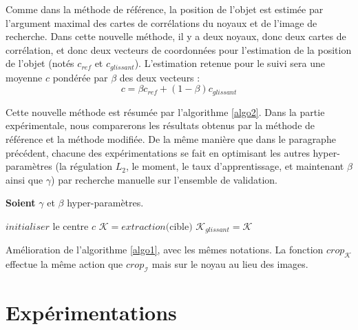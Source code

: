 \documentclass[10pt,twocolumn,letterpaper,french]{article}
\begin{document}
Comme dans la méthode de référence, la position de l'objet est estimée par l'argument maximal des cartes de corrélations du noyaux et de l'image de recherche. Dans cette nouvelle méthode, il y a deux noyaux, donc deux cartes de corrélation, et donc deux vecteurs de coordonnées pour l'estimation de la position de l'objet (notés $c_{ref}$ et $c_{glissant}$). L'estimation retenue pour le suivi sera une moyenne $c$ pondérée par $\beta$ des deux vecteurs :
$$c = \beta c_{ref} + (1-\beta) c_{glissant}$$

Cette nouvelle méthode est résumée par l'algorithme \ref{algo2}. Dans la partie expérimentale, nous comparerons les résultats obtenus par la méthode de référence et la méthode modifiée. De la même manière que dans le paragraphe précédent, chacune des expérimentations se fait en optimisant les autres hyper-paramètres (la régulation $L_2$, le moment, le taux d'apprentissage, et maintenant $\beta$ ainsi que $\gamma$) par recherche manuelle sur l'ensemble de validation.

\begin{algorithm}
\label{algo2}
\textbf{Soient} $\gamma$ et $\beta$ hyper-paramètres.

\SetAlgoLined
 $initialiser$ le centre $c$ \;
 $\mathcal{K} = extraction($cible$)$\;
 $\mathcal{K}_{glissant} = \mathcal{K}$\;
\caption{Amélioration de l'algorithme \ref{algo1}, avec les mêmes notations. La fonction $crop_{\mathcal{K}}$ effectue la même action que $crop_{\mathcal{I}}$ mais sur le noyau au lieu des images.}
\end{algorithm}




\section*{Expérimentations}
\end{document}
